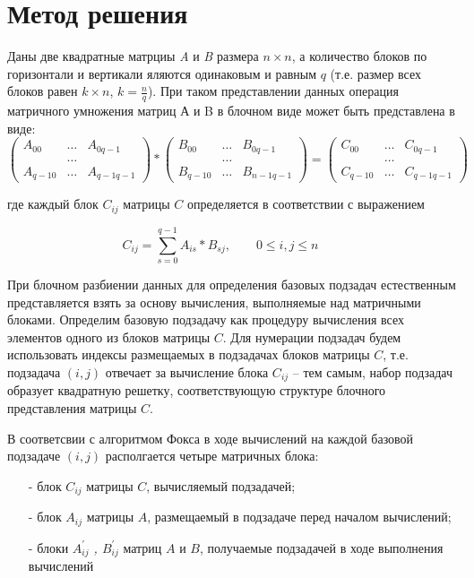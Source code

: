 \documentclass{report}
\begin{document}
\section*{Метод решения}
Даны две квадратные матрциы {\itshape A} и {\itshape B} размера {\itshape $n \times n$}, а количество блоков по горизонтали и вертикали яляются одинаковым и равным {\itshape $q$} (т.е. размер всех блоков равен {\itshape $k \times n$}, {\itshape $k = \frac{n}{q} $}). При таком представлении данных операция матричного умножения матриц А и B в блочном виде может быть представлена в виде:
$$
\begin{pmatrix}
A_{00}& \ldots & A_{0q-1}\\
& \ldots\\
A_{q-10}& \ldots & A_{q-1q-1}
\end{pmatrix}
*
\begin{pmatrix}
B_{00}& \ldots & B_{0q-1}\\
& \ldots\\
B_{q-10}& \ldots & B_{n-1q-1}
\end{pmatrix}
=
\begin{pmatrix}
C_{00}& \ldots & C_{0q-1}\\
&\ldots\\
C_{q-10}& \ldots & C_{q-1q-1}
\end{pmatrix}
$$

где каждый блок $C_{ij}$ матрицы {\itshape $C$} определяется в соответствии с выражением
\par$$
    C_{ij} = \sum_{s=0}^{q-1} A_{is} * B_{sj},\qquad 0 \le i,j \le n \qquad
    $$
\par При блочном разбиении данных для определения базовых подзадач естественным представляется взять за основу вычисления, выполняемые над матричными блоками. Определим базовую подзадачу как процедуру вычисления всех элементов одного из блоков матрицы {\itshape $C$}. Для нумерации подзадач будем использовать индексы размещаемых в подзадачах блоков матрицы {\itshape $C$}, т.е. подзадача {\itshape $(i,j)$} отвечает за вычисление блока {\itshape $C_{ij}$} – тем самым, набор подзадач образует квадратную решетку, соответствующую структуре блочного представления матрицы {\itshape $C$}.
\par В соответсвии с алгоритмом Фокса в ходе вычислений на каждой базовой подзадаче {\itshape $(i,j)$} располгается четыре матричных блока:
\begin{itemize}
    \item[-] блок {\itshape $C_{ij}$} матрицы {\itshape $C$}, вычисляемый подзадачей;
    \item[-] блок {\itshape $A_{ij}$} матрицы {\itshape $A$}, размещаемый в подзадаче перед началом вычислений;
    \item[-] блоки {\itshape $A_{ij}^{'}$ , $B_{ij}^{'}$} матриц {\itshape $A$} и {\itshape $B$}, получаемые подзадачей в ходе выполнения вычислений
\end{itemize}
\newpage
\end{document}
